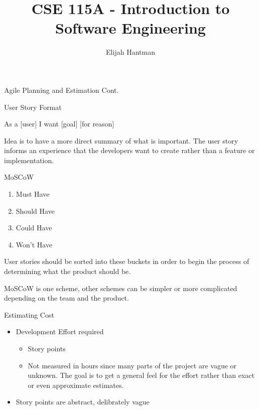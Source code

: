 \documentclass{report}
\title{\Huge{CSE 115A - Introduction to Software Engineering}}
\author{\huge{Elijah Hantman}}
\date{}
\begin{document}
\maketitle
\newpage

{\huge Agile Planning and Estimation Cont.}

\begin{description}
    \item User Story Format

        \begin{mdframed}
            As a [user] I want [goal] [for reason]
        \end{mdframed}

        Idea is to have a more direct summary of what
        is important. The user story informs an experience
        that the developers want to create rather than
        a feature or implementation.

    \item MoSCoW
        \begin{enumerate}
            \item Must Have
            \item Should Have
            \item Could Have
            \item Won't Have
        \end{enumerate}

        User stories should be sorted into these buckets
        in order to begin the process of determining what
        the product should be.

        MoSCoW is one scheme, other schemes can be simpler or
        more complicated depending on the team and the 
        product.

    \item Estimating Cost
        \begin{itemize}
            \item Development Effort required
                \begin{itemize}
                    \item Story points
                    \item Not measured in hours since
                        many parts of the project are vague
                        or unknown. The goal is to get a general
                        feel for the effort rather than exact
                        or even approximate estimates.
                \end{itemize}
            \item Story points are abstract, delibrately
                vague


\end{itemize}
\end{description}
\end{document}
